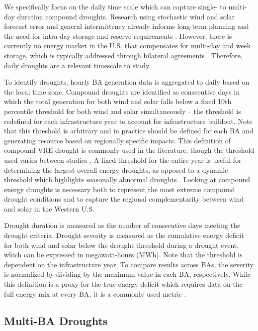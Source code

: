 \documentclass{agujournal2019}
\begin{document}
We specifically focus on the daily time scale which can capture single- to multi-day duration compound droughts. Research using stochastic wind and solar forecast error and general intermittency already informs long-term planning and the need for intra-day storage and reserve requirements \cite{Ghosal2023}. However, there is currently no energy market in the U.S. that compensates for multi-day and week storage, which is typically addressed through bilateral agreements \cite{Bhatnagar2022}. Therefore, daily droughts are a relevant timescale to study. 

To identify droughts, hourly BA generation data is aggregated to daily based on the local time zone. Compound droughts are identified as consecutive days in which the total generation for both wind and solar falls below a fixed 10th percentile threshold for both wind and solar simultaneously -- the threshold is redefined for each infrastructure year to account for infrastructure buildout. Note that this threshold is arbitrary and in practice should be defined for each BA and generating resource based on regionally specific impacts. This definition of compound VRE drought is commonly used in the literature, though the threshold used varies between studies \cite{Allen2023a,Kittel2024}. A fixed threshold for the entire year is useful for determining the largest overall energy droughts, as opposed to a dynamic threshold which highlights seasonally abnormal droughts \cite{Bracken2024}. Looking at compound energy droughts is necessary both to represent the most extreme compound drought conditions and to capture the regional complementarity between wind and solar in the Western U.S.     

Drought duration is measured as the number of consecutive days meeting the drought criteria. Drought severity is measured as the cumulative energy deficit for both wind and solar below the drought threshold during a drought event, which can be expressed in megawatt-hours (MWh). Note that the threshold is dependent on the infrastructure year. To compare results across BAs, the severity is normalized by dividing by the maximum value in each BA, respectively. While this definition is a proxy for the true energy deficit which requires data on the full energy mix at every BA, it is a commonly used metric \cite{Allen2023a}.

\subsection{Multi-BA Droughts}
\end{document}
